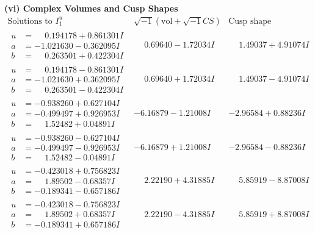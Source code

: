 \documentclass[1p]{elsarticle_modified}
\theoremstyle{definition}
\newcommand{\I}{\sqrt{-1}}
\begin{document}
\newpage\flushleft \textbf{(vi) Complex Volumes and Cusp Shapes}
$$\begin{array}{c|c|c}  
\text{Solutions to }I^u_{1}& \I (\text{vol} + \sqrt{-1}CS) & \text{Cusp shape}\\
 \hline 
\begin{aligned}
u &= \phantom{-}0.194178 + 0.861301 I \\
a &= -1.021630 - 0.362095 I \\
b &= \phantom{-}0.263501 + 0.422304 I\end{aligned}
 & \phantom{-}0.69640 - 1.72034 I & \phantom{-}1.49037 + 4.91074 I \\ \hline\begin{aligned}
u &= \phantom{-}0.194178 - 0.861301 I \\
a &= -1.021630 + 0.362095 I \\
b &= \phantom{-}0.263501 - 0.422304 I\end{aligned}
 & \phantom{-}0.69640 + 1.72034 I & \phantom{-}1.49037 - 4.91074 I \\ \hline\begin{aligned}
u &= -0.938260 + 0.627104 I \\
a &= -0.499497 + 0.926953 I \\
b &= \phantom{-}1.52482 + 0.04891 I\end{aligned}
 & -6.16879 - 1.21008 I & -2.96584 + 0.88236 I \\ \hline\begin{aligned}
u &= -0.938260 - 0.627104 I \\
a &= -0.499497 - 0.926953 I \\
b &= \phantom{-}1.52482 - 0.04891 I\end{aligned}
 & -6.16879 + 1.21008 I & -2.96584 - 0.88236 I \\ \hline\begin{aligned}
u &= -0.423018 + 0.756823 I \\
a &= \phantom{-}1.89502 - 0.68357 I \\
b &= -0.189341 - 0.657186 I\end{aligned}
 & \phantom{-}2.22190 + 4.31885 I & \phantom{-}5.85919 - 8.87008 I \\ \hline\begin{aligned}
u &= -0.423018 - 0.756823 I \\
a &= \phantom{-}1.89502 + 0.68357 I \\
b &= -0.189341 + 0.657186 I\end{aligned}
 & \phantom{-}2.22190 - 4.31885 I & \phantom{-}5.85919 + 8.87008 I \\ \hline\begin{aligned}

\end{aligned}
\end{array}$$
\end{document}
